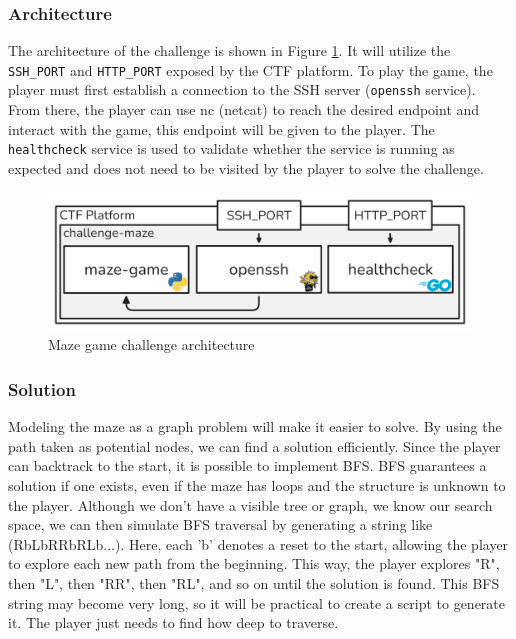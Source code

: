 \subsubsection{Architecture}
The architecture of the challenge is shown in Figure \ref{fig:maze-architecture}. It will utilize the \texttt{SSH\_PORT} and \texttt{HTTP\_PORT} exposed by the CTF platform. To play the game, the player must first establish a connection to the SSH server (\texttt{openssh} service). From there, the player can use nc (netcat) to reach the desired endpoint and interact with the game, this endpoint will be given to the player. The \texttt{healthcheck} service is used to validate whether the service is running as expected and does not need to be visited by the player to solve the challenge.

\begin{figure}[H]
    \centering
    \includegraphics[width=0.85\linewidth]{img/challenge-maze--architecture.png}
    \caption{Maze game challenge architecture}
    \label{fig:maze-architecture}
\end{figure}


\subsubsection{Solution}
Modeling the maze as a graph problem will make it easier to solve. By using the path taken as potential nodes, we can find a solution efficiently. Since the player can backtrack to the start, it is possible to implement BFS. BFS guarantees a solution if one exists, even if the maze has loops and the structure is unknown to the player. Although we don’t have a visible tree or graph, we know our search space, we can then simulate BFS traversal by generating a string like (RbLbRRbRLb...). Here, each 'b' denotes a reset to the start, allowing the player to explore each new path from the beginning. This way, the player explores "R", then "L", then "RR", then "RL", and so on until the solution is found. This BFS string may become very long, so it will be practical to create a script to generate it. The player just needs to find how deep to traverse.



